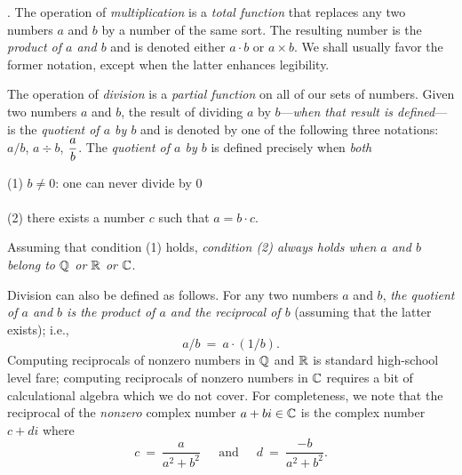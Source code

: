 .
%
The operation of {\it multiplication}
is a {\em total function} that replaces any two numbers $a$ and $b$ by
a number of the same sort.  The resulting number is the {\em product
  of $a$ and $b$} and is
denoted either $a \cdot b$ 
or $a \times b$.
We shall usually favor the former notation, except when the latter
enhances legibility.

The operation of {\it division} is a {\em
  partial function} on all of our sets of numbers.  Given two numbers
$a$ and $b$, the result of dividing $a$ by $b$---{\em when that result
  is defined}---is the {\it quotient of $a$ by $b$}
and is denoted by one of the following three notations: $a/b$, $a \div
b$, $\displaystyle{a \over b}$.  The {\it quotient of $a$ by $b$} is
defined precisely when {\em both}

\noindent
\hspace*{.35in}(1) $b \neq 0$: one can never divide by $0$ \\
\hspace*{.35in}{\em and} \\
\hspace*{.35in}(2) there exists a number $c$ such that $a = b \cdot c$.

\noindent
Assuming that condition (1) holds, {\em condition (2) always holds
  when $a$ and $b$ belong to $\mathbb{Q}$ or $\mathbb{R}$ or $\mathbb{C}$}.

Division can also be defined as follows.  For any two numbers $a$
and $b$, {\em the quotient of $a$ and $b$ is the product of $a$ and the
reciprocal of $b$} (assuming that the latter exists); i.e.,
\[ a/b \ = \ a \cdot (1/b). \]
Computing reciprocals of nonzero numbers in $\mathbb{Q}$ and $\mathbb{R}$ is standard
high-school level fare; computing reciprocals of nonzero numbers in
$\mathbb{C}$ requires a bit of calculational algebra which we do not cover.
For completeness, we note that the reciprocal of the {\em nonzero}
complex number $a + bi \in \mathbb{C}$ is the complex number $c+di$ where
\[ c \ = \ \frac{a}{a^2 + b^2} \ \ \ \ \
\mbox{ and } \ \ \ \ \
d \ = \ \frac{-b}{a^2 + b^2}.
\]

